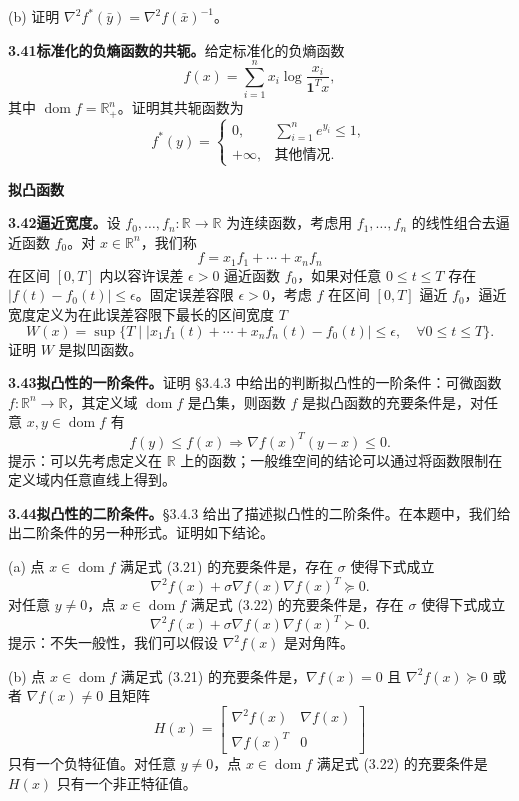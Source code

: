 \documentclass[UTF8, 12pt, fontset=fandol, oneside]{ctexart}
\DeclareMathOperator{\dom}{dom}
\begin{document}
(b) 证明 $\nabla^2 f^*(\bar y)=\nabla^2 f(\bar x)^{-1}$。

\noindent\textbf{3.41\quad 标准化的负熵函数的共轭。}\quad 给定标准化的负熵函数
\[
f(x)=\sum_{i=1}^n x_i\log\frac{x_i}{\mathbf{1}^Tx},
\]
其中 $\dom f=\mathbb{R}_+^n$。证明其共轭函数为
\[
f^*(y)=
\begin{cases}
0, & \sum_{i=1}^n e^{y_i}\leq1,\\
+\infty, & \text{其他情况}.
\end{cases}
\]

\noindent\textbf{拟凸函数}

\noindent\textbf{3.42\quad 逼近宽度。}\quad 设 $f_0,\ldots,f_n:\mathbb{R}\to\mathbb{R}$ 为连续函数，考虑用 $f_1,\ldots,f_n$ 的线性组合去逼近函数 $f_0$。对 $x\in\mathbb{R}^n$，我们称
\[
f=x_1f_1+\cdots+x_nf_n
\]
在区间 $[0,T]$ 内以容许误差 $\epsilon>0$ 逼近函数 $f_0$，如果对任意 $0\leq t\leq T$ 存在 $|f(t)-f_0(t)|\leq\epsilon$。固定误差容限 $\epsilon>0$，考虑 $f$ 在区间 $[0,T]$ 逼近 $f_0$，逼近宽度定义为在此误差容限下最长的区间宽度 $T$
\[
W(x)=\sup\{T\mid |x_1f_1(t)+\cdots+x_nf_n(t)-f_0(t)|\leq\epsilon,\quad \forall 0\leq t\leq T\}.
\]
证明 $W$ 是拟凹函数。

\noindent\textbf{3.43\quad 拟凸性的一阶条件。}\quad 证明 \S3.4.3 中给出的判断拟凸性的一阶条件：可微函数 $f:\mathbb{R}^n\to\mathbb{R}$，其定义域 $\dom f$ 是凸集，则函数 $f$ 是拟凸函数的充要条件是，对任意 $x,y\in\dom f$ 有
\[
f(y)\leq f(x)\Longrightarrow \nabla f(x)^T(y-x)\leq0.
\]
提示：可以先考虑定义在 $\mathbb{R}$ 上的函数；一般维空间的结论可以通过将函数限制在定义域内任意直线上得到。

\noindent\textbf{3.44\quad 拟凸性的二阶条件。}\quad \S3.4.3 给出了描述拟凸性的二阶条件。在本题中，我们给出二阶条件的另一种形式。证明如下结论。

(a) 点 $x\in\dom f$ 满足式 (3.21) 的充要条件是，存在 $\sigma$ 使得下式成立
\begin{equation}
\nabla^2 f(x)+\sigma\nabla f(x)\nabla f(x)^T\succeq0.
\tag{3.26}
\end{equation}
对任意 $y\neq0$，点 $x\in\dom f$ 满足式 (3.22) 的充要条件是，存在 $\sigma$ 使得下式成立
\begin{equation}
\nabla^2 f(x)+\sigma\nabla f(x)\nabla f(x)^T\succ0.
\tag{3.27}
\end{equation}
提示：不失一般性，我们可以假设 $\nabla^2 f(x)$ 是对角阵。

(b) 点 $x\in\dom f$ 满足式 (3.21) 的充要条件是，$\nabla f(x)=0$ 且 $\nabla^2 f(x)\succeq0$ 或者 $\nabla f(x)\neq0$ 且矩阵
\[
H(x)=
\begin{bmatrix}
\nabla^2 f(x) & \nabla f(x)\\
\nabla f(x)^T & 0
\end{bmatrix}
\]
只有一个负特征值。对任意 $y\neq0$，点 $x\in\dom f$ 满足式 (3.22) 的充要条件是 $H(x)$ 只有一个非正特征值。
\end{document}
